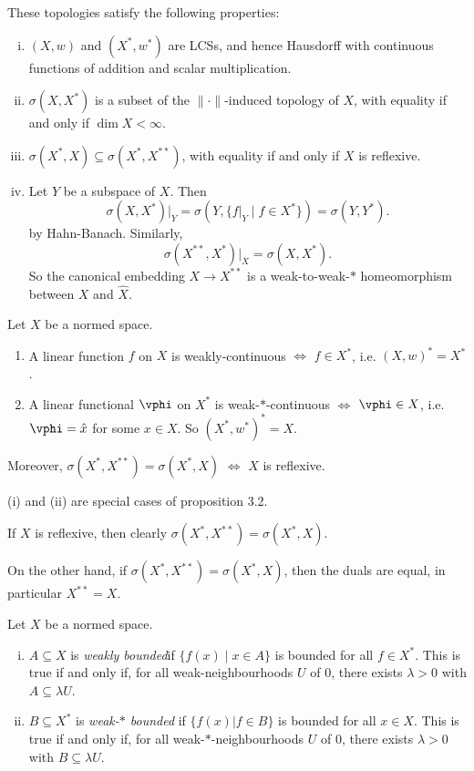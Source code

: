 \documentclass[12pt]{article}
\begin{document}
These topologies satisfy the following properties:
\begin{enumerate}[(i)]
	\item $(X, w)$ and $(X^{\ast}, w^{\ast})$ are LCSs, and hence Hausdorff with continuous functions of addition and scalar multiplication.
	\item $\sigma(X, X^{\ast})$ is a subset of the $\|\cdot\|$-induced topology of $X$, with equality if and only if $\dim X < \infty$.
	\item $\sigma(X^{\ast}, X) \subseteq \sigma(X^{\ast}, X^{\ast\ast})$, with equality if and only if $X$ is reflexive.
	\item Let $Y$ be a subspace of $X$. Then
		\[
			\sigma(X, X^{\ast})|_Y = \sigma(Y, \{f|_Y \mid f \in X^{\ast}\}) = \sigma(Y, Y^{\ast}).
		\]
		by Hahn-Banach. Similarly,
		\[
		\sigma(X^{\ast\ast}, X^{\ast})|_X = \sigma(X, X^{\ast}).
		\]
		So the canonical embedding $X \to X^{\ast\ast}$ is a weak-to-weak-$\ast$ homeomorphism between $X$ and $\hat X$.
\end{enumerate}

\begin{proposition}
	Let $X$ be a normed space.
	\begin{enumerate}[\normalfont(i)]
		\item A linear function $f$ on $X$ is weakly-continuous $\iff$ $f \in X^{\ast}$, i.e. $(X, w)^{\ast} = X^{\ast}$.
		\item A linear functional $\vphi$ on $X^{\ast}$ is weak-$\ast$-continuous $\iff$ $\vphi \in X$, i.e. $\vphi = \hat x$ for some $x \in X$. So $(X^{\ast}, w^{\ast})^{\ast} = X$.
	\end{enumerate}
	Moreover, $\sigma(X^{\ast}, X^{\ast\ast}) = \sigma(X^{\ast}, X)$ $\iff$ $X$ is reflexive.
\end{proposition}

\begin{proofbox}
	(i) and (ii) are special cases of proposition 3.2.

	If $X$ is reflexive, then clearly $\sigma(X^{\ast}, X^{\ast\ast}) = \sigma(X^{\ast}, X)$.

	On the other hand, if $\sigma(X^{\ast}, X^{\ast\ast}) = \sigma(X^{\ast}, X)$, then the duals are equal, in particular $X^{\ast\ast} = X$.
\end{proofbox}

\begin{definition}
	Let $X$ be a normed space.
	\begin{enumerate}[(i)]
		\item $A \subseteq X$ is \emph{weakly bounded}if $\{f(x) \mid x \in A\}$ is bounded for all $f \in X^{\ast}$. This is true if and only if, for all weak-neighbourhoods $U$ of $0$, there exists $\lambda > 0$ with $A \subseteq \lambda U$.
		\item $B \subseteq X^{\ast}$ is \emph{weak-$\ast$ bounded} if $\{f(x) | f \in B\}$ is bounded for all $x \in X$. This is true if and only if, for all weak-$\ast$-neighbourhoods $U$ of $0$, there exists $\lambda > 0$ with $B \subseteq \lambda U$.
	\end{enumerate}
\end{definition}
\end{document}
